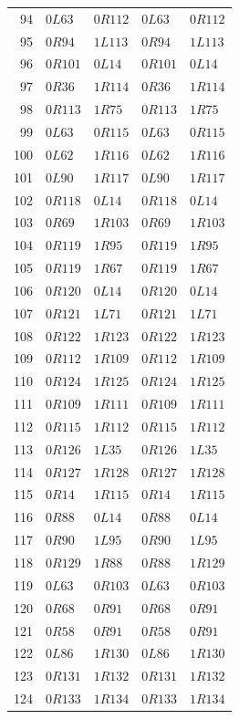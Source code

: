 {\begin{longtable}{@{}rllll@{}}
94 & $0L63$ & $0R112$ & $0L63$ & $0R112$\\
95 & $0R94$ & $1L113$ & $0R94$ & $1L113$\\
96 & $0R101$ & $0L14$ & $0R101$ & $0L14$\\
97 & $0R36$ & $1R114$ & $0R36$ & $1R114$\\
98 & $0R113$ & $1R75$ & $0R113$ & $1R75$\\
99 & $0L63$ & $0R115$ & $0L63$ & $0R115$\\
100 & $0L62$ & $1R116$ & $0L62$ & $1R116$\\
101 & $0L90$ & $1R117$ & $0L90$ & $1R117$\\
102 & $0R118$ & $0L14$ & $0R118$ & $0L14$\\
103 & $0R69$ & $1R103$ & $0R69$ & $1R103$\\
104 & $0R119$ & $1R95$ & $0R119$ & $1R95$\\
105 & $0R119$ & $1R67$ & $0R119$ & $1R67$\\
106 & $0R120$ & $0L14$ & $0R120$ & $0L14$\\
107 & $0R121$ & $1L71$ & $0R121$ & $1L71$\\
108 & $0R122$ & $1R123$ & $0R122$ & $1R123$\\
109 & $0R112$ & $1R109$ & $0R112$ & $1R109$\\
110 & $0R124$ & $1R125$ & $0R124$ & $1R125$\\
111 & $0R109$ & $1R111$ & $0R109$ & $1R111$\\
112 & $0R115$ & $1R112$ & $0R115$ & $1R112$\\
113 & $0R126$ & $1L35$ & $0R126$ & $1L35$\\
114 & $0R127$ & $1R128$ & $0R127$ & $1R128$\\
115 & $0R14$ & $1R115$ & $0R14$ & $1R115$\\
116 & $0R88$ & $0L14$ & $0R88$ & $0L14$\\
117 & $0R90$ & $1L95$ & $0R90$ & $1L95$\\
118 & $0R129$ & $1R88$ & $0R88$ & $1R129$\\
119 & $0L63$ & $0R103$ & $0L63$ & $0R103$\\
120 & $0R68$ & $0R91$ & $0R68$ & $0R91$\\
121 & $0R58$ & $0R91$ & $0R58$ & $0R91$\\
122 & $0L86$ & $1R130$ & $0L86$ & $1R130$\\
123 & $0R131$ & $1R132$ & $0R131$ & $1R132$\\
124 & $0R133$ & $1R134$ & $0R133$ & $1R134$\\

\end{longtable}}
